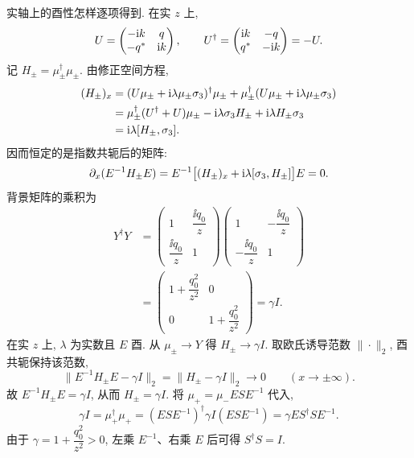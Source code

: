 \par\medskip\noindent 实轴上的酉性怎样逐项得到.\quad
在实 $z$ 上,
\begin{equation*}
U=\begin{pmatrix}-\mathrm{i} k&q\\-{q}^{*}&\mathrm{i} k\end{pmatrix},
\qquad
U^\dagger=\begin{pmatrix}\mathrm{i} k&-q\\{q}^{*}&-\mathrm{i} k\end{pmatrix}=-U.
\end{equation*}
记 $H_\pm=\mu_\pm^\dagger\mu_\pm$. 由修正空间方程,
\begin{align*}
(H_\pm)_x
&=(U\mu_\pm+\mathrm{i}\lambda\mu_\pm\sigma_3)^\dagger\mu_\pm
+\mu_\pm^\dagger(U\mu_\pm+\mathrm{i}\lambda\mu_\pm\sigma_3)\\
&=\mu_\pm^\dagger(U^\dagger+U)\mu_\pm
-\mathrm{i}\lambda\sigma_3 H_\pm+\mathrm{i}\lambda H_\pm\sigma_3\\
&=\mathrm{i}\lambda[H_\pm,\sigma_3].
\end{align*}
因而恒定的是指数共轭后的矩阵:
\begin{equation*}
\partial_x(E^{-1}H_\pm E)
=E^{-1}\bigl[(H_\pm)_x+\mathrm{i}\lambda[\sigma_3,H_\pm]\bigr]E=0.
\end{equation*}
背景矩阵的乘积为
\begin{align*}
Y^\dagger Y
&=\begin{pmatrix}1&\dfrac{\ii q_0}{z}\\
\dfrac{\ii q_0}{z}&1\end{pmatrix}
\begin{pmatrix}1&-\dfrac{\ii q_0}{z}\\
-\dfrac{\ii q_0}{z}&1\end{pmatrix}\\
&=\begin{pmatrix}1+\dfrac{q_0^2}{z^2}&0\\
0&1+\dfrac{q_0^2}{z^2}\end{pmatrix}=\gamma I.
\end{align*}
在实 $z$ 上, $\lambda$ 为实数且 $E$ 酉. 从 $\mu_\pm\to Y$ 得
$H_\pm\to\gamma I$. 取欧氏诱导范数 $\|\cdot\|_2$, 酉共轭保持该范数,
\begin{equation*}
\|E^{-1}H_\pm E-\gamma I\|_2
=\|H_\pm-\gamma I\|_2\longrightarrow0
\qquad(x\to\pm\infty).
\end{equation*}
故 $E^{-1}H_\pm E=\gamma I$, 从而 $H_\pm=\gamma I$.
将 $\mu_+=\mu_-ESE^{-1}$ 代入,
\begin{equation*}
\gamma I=\mu_+^\dagger\mu_+
=(ESE^{-1})^\dagger\gamma I(ESE^{-1})
=\gamma ES^\dagger SE^{-1}.
\end{equation*}
由于 $\gamma=1+\dfrac{q_0^2}{z^2}>0$, 左乘 $E^{-1}$、右乘 $E$ 后可得 $S^\dagger S=I$.

